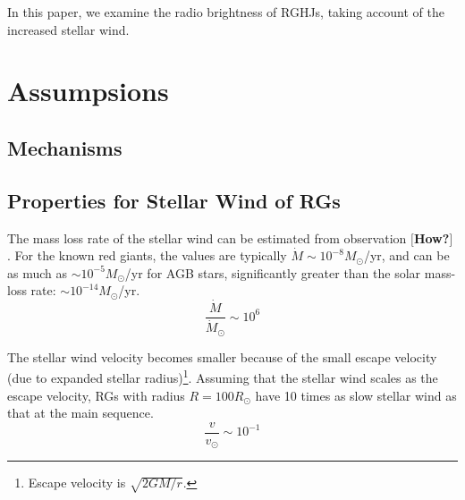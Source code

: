 \documentclass{emulateapj}
\def\memo#1{\color{red}$[${\bf #1}$]$ \color{black}}
\begin{document}
In this paper, we examine the radio brightness of RGHJs, taking account of the increased stellar wind. 









\section{Assumpsions}

\subsection{Mechanisms}


\subsection{Properties for Stellar Wind of RGs}

The mass loss rate of the stellar wind can be estimated from observation \memo{How?}. For the known red giants, the values are typically $\dot M \sim 10^{-8} M_{\odot}$/yr, and can be as much as $\sim  10^{-5} M_{\odot }$/yr for AGB stars, significantly greater than the solar mass-loss rate: $\sim 10^{-14} M_{\odot}$/yr. 
\begin{equation}
\frac{\dot M}{\dot M_{\odot}} \sim 10^6
\end{equation}

The stellar wind velocity becomes smaller because of the small escape velocity (due to expanded stellar radius)\footnote{Escape velocity is $\sqrt{2GM/r}$.}. Assuming that the stellar wind scales as the escape velocity, RGs with radius $R=100R_{\odot}$ have 10 times as slow stellar wind as that at the main sequence.
\begin{equation}
\frac{v}{v_{\odot}} \sim 10^{-1}
\end{equation}
\end{document}
